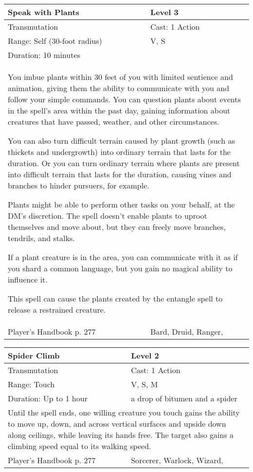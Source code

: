 \documentclass[11pt]{report}
\begin{document}
\begin{table}[H]
	\begin{tabular}{||p{6cm}|p{6cm}||}
		\hline\hline
		\bf{Speak with Plants} & Level 3\\ \hline
		Transmutation & Cast: 1 Action\\ \hline
		Range: Self (30-foot radius) & V, S\\ \hline
		Duration: 10 minutes & \\ \hline
		\multicolumn{2}{||p{12cm}||}{You imbue plants within 30 feet of you with limited sentience and animation, giving them the ability to communicate with you and follow your simple commands. You can question plants about events in the spell’s area within the past day, gaining information about creatures that have passed, weather, and other circumstances.

You can also turn difficult terrain caused by plant growth (such as thickets and undergrowth) into ordinary terrain that lasts for the duration. Or you can turn ordinary terrain where plants are present into difficult terrain that lasts for the duration, causing vines and branches to hinder pursuers, for example.

Plants might be able to perform other tasks on your behalf, at the DM’s discretion. The spell doesn’t enable plants to uproot themselves and move about, but they can freely move branches, tendrils, and stalks.

If a plant creature is in the area, you can communicate with it as if you shard a common language, but you gain no magical ability to influence it.

This spell can cause the plants created by the entangle spell to release a restrained creature.}\\ \hline
Player's Handbook p. 277 & Bard, Druid, Ranger, \\ \hline\hline
	\end{tabular}
\end{table}

\begin{table}[H]
	\begin{tabular}{||p{6cm}|p{6cm}||}
		\hline\hline
		\bf{Spider Climb} & Level 2\\ \hline
		Transmutation & Cast: 1 Action\\ \hline
		Range: Touch & V, S, M\\ \hline
		Duration: Up to 1 hour & a drop of bitumen and a spider\\ \hline
		\multicolumn{2}{||p{12cm}||}{Until the spell ends, one willing creature you touch gains the ability to move up, down, and across vertical surfaces and upside down along ceilings, while leaving its hands free. The target also gains a climbing speed equal to its walking speed.}\\ \hline
Player's Handbook p. 277 & Sorcerer, Warlock, Wizard, \\ \hline\hline
	\end{tabular}
\end{table}
\end{document}
